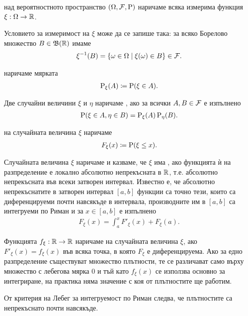 \documentclass[numbers=endperiod, bibliography=totocnumbered]{scrartcl}
\begin{document}
\begin{definition}
   над вероятностното пространство \( (\Omega, \mathcal{F}, \operatorname{P}) \) наричаме всяка измерима функция \( \xi : \Omega \to \mathbb{R} \).

  Условието за измеримост на \( \xi \) може да се запише така: за всяко Борелово множество \( B \in \mathfrak{B}(\mathbb{R}) \) имаме
  \begin{align*}
    \xi^{-1} (B) = \{ \omega \in \Omega \mid \xi(\omega) \in B \} \in \mathcal{F}.
  \end{align*}

   наричаме мярката
  \begin{align*}
    \operatorname{P}_\xi(A) \coloneqq \operatorname{P}(\xi \in A).
  \end{align*}

  Две случайни величини \( \xi \) и \( \eta \) наричаме , ако за всички \( A, B \in \mathcal{F} \) е изпълнено
  \begin{align*}
    \operatorname{P}(\xi \in A, \eta \in B) = \operatorname{P}_\xi(A) \operatorname{P}_\eta(B).
  \end{align*}

   на случайната величина \( \xi \) наричаме
  \begin{align*}
    F_\xi(x) \coloneqq \operatorname{P}(\xi \leq x).
  \end{align*}

  Случайната величина \( \xi \) наричаме  и казваме, че \( \xi \) има , ако функцията ѝ на разпределение е локално абсолютно непрекъсната в \( \mathbb{R} \), т.е. абсолютно непрекъсната във всеки затворен интервал. Известно е, че абсолютно непрекъснатите в затворен интервал \( [a, b] \) функции са точно тези, които са диференцируеми почти навсякъде в интервала, производните им в \( [a, b] \) са интегруеми по Риман и за \( x \in [a, b] \) е изпълнено
  \begin{align*}
    F_\xi(x) = \int_a^x F'_\xi(x) + F_\xi(a).
  \end{align*}

  Функцията \( f_\xi: \mathbb{R} \to \mathbb{R} \) наричаме  на случайната величина \( \xi \), ако \( F'_\xi(x) = f_\xi(x) \) във всяка точка, в която \( F_\xi \) е диференцируема. Ако за едно разпределение съществуват множество плътности, те се различават само върху множество с лебегова мярка 0 и тъй като \( f_\xi(x) \) се използва основно за интегриране, на практика няма значение с коя от плътностите ще работим.

  От критерия на Лебег за интегруемост по Риман следва, че плътностите са непрекъснато почти навсякъде.
\end{definition}
\end{document}
